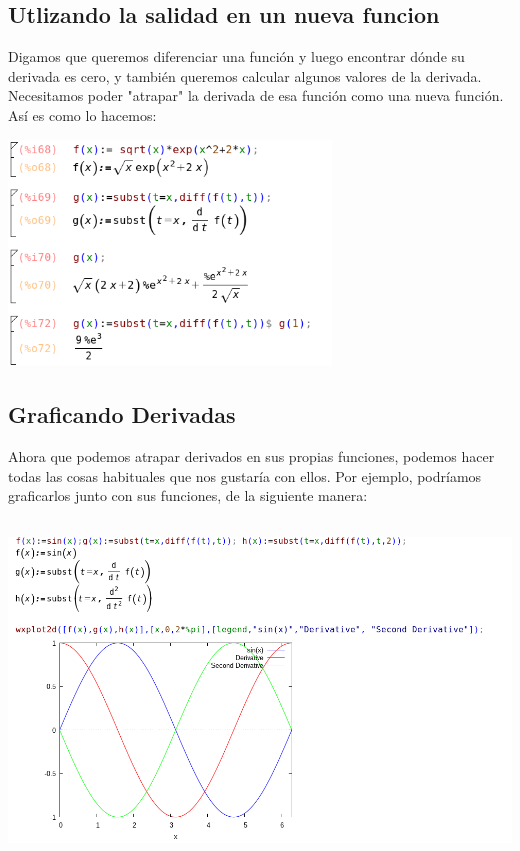 \documentclass{article}
\begin{document}
\subsection{Utlizando la salidad en un nueva funcion}

Digamos que queremos diferenciar una función y luego encontrar dónde su derivada es cero, y también queremos calcular algunos valores de la derivada. Necesitamos poder "atrapar" la derivada de esa función como una nueva función. Así es como lo hacemos:


\begin{center}
\includegraphics[height=6cm]{fto23.png}
\end{center}

\subsection{Graficando Derivadas}


Ahora que podemos atrapar derivados en sus propias funciones, podemos hacer todas las cosas habituales que nos gustaría con ellos. Por ejemplo, podríamos graficarlos junto con sus funciones, de la siguiente manera:

\begin{center}
\includegraphics[height=9cm]{fto24.png}
\end{center}
\end{document}
